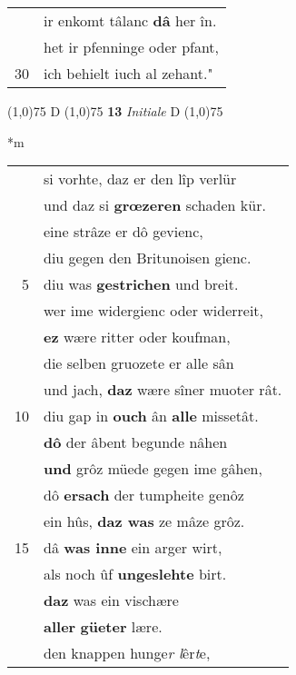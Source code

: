 \documentclass[8pt,a4paper,notitlepage]{article}
\begin{document}
\begin{table}[ht]
\begin{minipage}[t]{0.5\linewidth}
\begin{tabular}{rl}
 & ir enkomt tâlanc \textbf{dâ} her în.\\ 
 & het ir pfenninge oder pfant,\\ 
30 & ich behielt iuch al zehant."\\ 
\end{tabular}
\scriptsize
\line(1,0){75} \newline
D \newline
\line(1,0){75} \newline
\textbf{13} \textit{Initiale} D  \newline
\line(1,0){75} \newline
\newline
\end{minipage}
\hspace{0.5cm}
\begin{minipage}[t]{0.5\linewidth}
\small
\begin{center}*m
\end{center}
\begin{tabular}{rl}
 & si vorhte, daz er den lîp verlür\\ 
 & und daz si \textbf{grœzeren} schaden kür.\\ 
 & eine strâze er dô gevienc,\\ 
 & diu gegen den Britunoisen gienc.\\ 
5 & diu was \textbf{gestrichen} und breit.\\ 
 & wer ime widergienc oder widerreit,\\ 
 & \textbf{ez} wære ritter oder koufman,\\ 
 & die selben gruozete er alle sân\\ 
 & und jach, \textbf{daz} wære sîner muoter rât.\\ 
10 & diu gap in \textbf{ouch} ân \textbf{alle} missetât.\\ 
 & \textbf{dô} der âbent begunde nâhen\\ 
 & \textbf{und} grôz müede gegen ime gâhen,\\ 
 & dô \textbf{ersach} der tumpheite genôz\\ 
 & ein hûs, \textbf{daz was} ze mâze grôz.\\ 
15 & dâ \textbf{was inne} ein arger wirt,\\ 
 & als noch ûf \textbf{ungeslehte} birt.\\ 
 & \textbf{daz} was ein vischære\\ 
 & \textbf{aller} \textbf{güeter} lære.\\ 
 & den knappen hunge\textit{r l}êr\textit{t}e,\\ 

\end{tabular}
\end{minipage}
\end{table}
\end{document}
